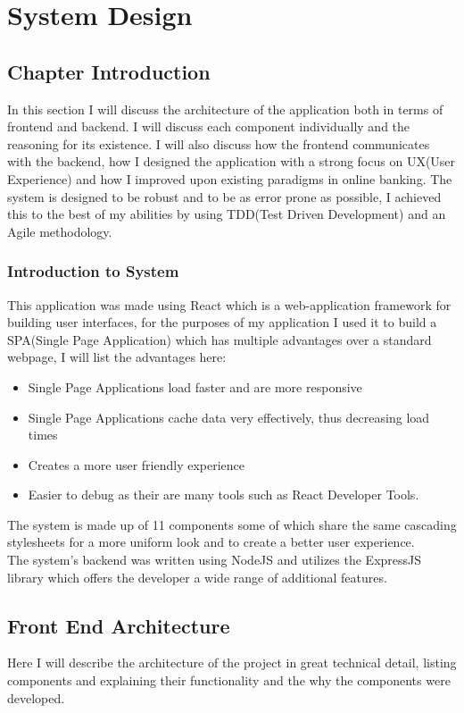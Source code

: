 \chapter{System Design}
\section{Chapter Introduction}
In this section I will discuss the architecture of the application both in terms of frontend and backend.
I will discuss each component individually and the reasoning for its existence.  I will also discuss how
the frontend communicates with the backend, how I designed the application with a strong focus on UX(User Experience)
and how I improved upon existing paradigms in online banking.  The system is designed to be robust and to be as
error prone as possible, I achieved this to the best of my abilities by using TDD(Test Driven Development) and an
Agile methodology.
\subsection{Introduction to System}
This application was made using React which is a web-application framework for building user interfaces,
for the purposes of my application I used it to build a SPA(Single Page Application) which has multiple
advantages over a standard webpage, I will list the advantages here:
\begin{itemize}
  \item Single Page Applications load faster and are more responsive
  \item Single Page Applications cache data very effectively, thus decreasing load times
  \item Creates a more user friendly experience
  \item Easier to debug as their are many tools such as React Developer Tools.
\end{itemize}
The system is made up of 11 components some of which share the same cascading stylesheets for
a more uniform look and to create a better user experience.
\\
The system's backend was written using NodeJS and utilizes the ExpressJS library
which offers the developer a wide range of additional features.
\section{Front End Architecture}
Here I will describe the architecture of the project in great technical detail, listing components and explaining their functionality and the why the components were developed.
